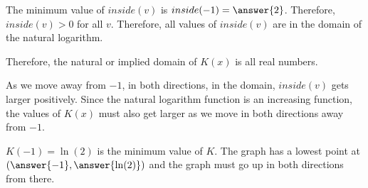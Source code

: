 \documentclass{ximera}
\begin{document}
\begin{example}
The minimum value of $inside(v)$ is $inside(-1) = \answer{2}$.  Therefore, $inside(v) > 0$ for all $v$. Therefore, all values of $inside(v)$ are in the domain of the natural logarithm.

Therefore, the natural or implied domain of $K(x)$ is all real numbers.



As we move away from $-1$, in both directions, in the domain, $inside(v)$ gets larger positively. Since the natural logarithm function is an increasing function, the values of $K(x)$ must also get larger as we move in both directions away from $-1$.




$K(-1) = \ln(2)$ is the minimum value of $K$.  The graph has a lowest point at $\left( \answer{-1}, \answer{\ln(2)} \right)$ and the graph must go up in both directions from there.








\begin{image}
\end{image}
\end{example}
\end{document}
